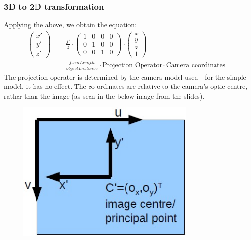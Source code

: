\subsubsection{3D to 2D transformation}
Applying the above, we obtain the equation:
\begin{align}
      \begin{pmatrix}
    x' \\ y'\\ z'
    \end{pmatrix}
    &= \frac{f'}{z} \cdot 
    \begin{pmatrix}
    1 & 0 & 0 & 0\\ 0 & 1 & 0 & 0\\ 0 & 0 & 1 & 0
    \end{pmatrix}
    \cdot     \begin{pmatrix}
    x \\ y\\ z\\ 1
    \end{pmatrix}  \\
    &= \frac{focalLength}{objectDistance} \cdot
    \text{Projection Operator} \cdot \text{Camera coordinates} \nonumber
\end{align}
The projection operator is determined by the camera model used - for the simple model, it has no effect. The co-ordinates are relative to the camera's optic centre, rather than the image (as seen in the below image from the slides). 
\begin{figure}[H]
    \centering
    \includegraphics[width = \textwidth, height=7cm,keepaspectratio ]{Images/Coordinate_conversion}
\end{figure}

